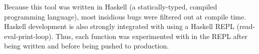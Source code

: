   Because this tool was written in Haskell (a statically-typed, compiled programming language), most insidious bugs were filtered out at compile time. Haskell development is also strongly integrated with using a Haskell REPL (read-eval-print-loop). Thus, each function was experimented with in the REPL after being written and before being pushed to production. 
